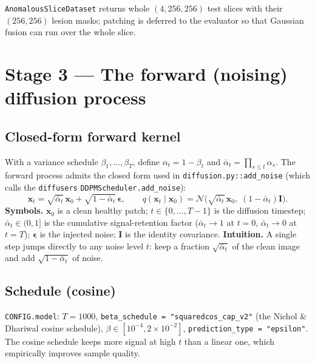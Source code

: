 \documentclass[11pt,a4paper]{article}
\newcommand{\N}{\mathcal{N}}
\newcommand{\x}{\bm{x}}
\newcommand{\eps}{\bm{\epsilon}}
\newcommand{\II}{\mathbf{I}}
\newcommand{\abar}{\bar{\alpha}}
\newcommand{\code}[1]{\texttt{\small #1}}
\begin{document}
\code{AnomalousSliceDataset} returns whole $(4,256,256)$ test slices with their
$(256,256)$ lesion masks; patching is deferred to the evaluator so that Gaussian
fusion can run over the whole slice.

\section{Stage 3 — The forward (noising) diffusion process}

\subsection{Closed-form forward kernel}
With a variance schedule $\beta_1,\dots,\beta_T$, define
$\alpha_t = 1-\beta_t$ and $\abar_t=\prod_{s\le t}\alpha_s$. The forward process
admits the closed form used in \code{diffusion.py::add\_noise} (which calls the
\code{diffusers} \code{DDPMScheduler.add\_noise}):
\begin{equation}
\label{eq:forward}
\x_t = \sqrt{\abar_t}\,\x_0 + \sqrt{1-\abar_t}\,\eps,
\qquad
q(\x_t\mid\x_0)=\N\!\big(\sqrt{\abar_t}\,\x_0,\;(1-\abar_t)\II\big).
\end{equation}
\textbf{Symbols.} $\x_0$ is a clean healthy patch; $t\in\{0,\dots,T-1\}$ is the
diffusion timestep; $\abar_t\in(0,1]$ is the cumulative signal-retention factor
($\abar_t\!\to\!1$ at $t{=}0$, $\abar_t\!\to\!0$ at $t{=}T$); $\eps$ is the
injected noise; $\II$ is the identity covariance.
\textbf{Intuition.} A single step jumps directly to any noise level $t$: keep a
fraction $\sqrt{\abar_t}$ of the clean image and add $\sqrt{1-\abar_t}$ of noise.

\subsection{Schedule (cosine)}
\code{CONFIG.model}: $T=1000$, \code{beta\_schedule = "squaredcos\_cap\_v2"}
(the Nichol \& Dhariwal cosine schedule), $\beta\in[10^{-4},2\times10^{-2}]$,
\code{prediction\_type = "epsilon"}. The cosine schedule keeps more signal at
high $t$ than a linear one, which empirically improves sample quality.
\end{document}
